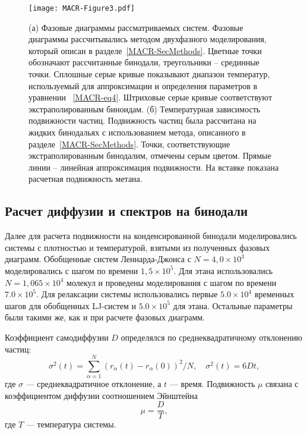 \begin{figure}[!t]
  \centering
  \texttt{[image: MACR-Figure3.pdf]}
  \caption{(а) Фазовые диаграммы рассматриваемых систем. 
    Фазовые диаграммы рассчитывались методом двухфазного моделирования, который описан в разделе~\ref{MACR-SecMethods}.
    Цветные точки обозначают рассчитанные бинодали, треугольники -- срединные точки.
    Сплошные серые кривые показывают диапазон температур, используемый для аппроксимации и определения параметров в уравнении ~\eqref{MACR-eq4}.
    Штриховые серые кривые соответствуют экстраполированным биноидам.
    (б) Температурная зависимость подвижности частиц.
    Подвижность частиц была рассчитана на жидких бинодальях с использованием метода, описанного в разделе~\ref{MACR-SecMethods}.
    Точки, соответствующие экстраполированным бинодалим, отмечены серым цветом. 
    Прямые линии -- линейная аппроксимация подвижности.
    На вставке показана расчетная подвижность метана.}
  \label{MACR-Figure3}
\end{figure}

\subsection{Расчет диффузии и спектров на бинодали}

Далее для расчета подвижности на конденсированной бинодали моделировались системы с плотностью и температурой, взятыми из полученных фазовых диаграмм.
Обобщенные систем Леннарда-Джонса с $N = 4,0 \times 10 ^ 3$ моделировались с шагом по времени $1,5 \times 10 ^ 5$.
Для этана использовались $N = 1,065 \times 10 ^ 4 $ молекул и проведены моделирования с шагом по времени $7.0 \times 10^5 $.
Для релаксации системы использовались первые $ 5.0 \times 10 ^ 4 $ временных шагов для обобщенных LJ-систем и $ 5.0 \times 10 ^ 5 $ для этана.
Остальные параметры были такими же, как и при расчете фазовых диаграмм.

Коэффициент самодиффузии $D$ определялся по среднеквадратичному отклонению частиц:
\begin{equation}
  \sigma^2(t) = \sum\limits_{\alpha = 1}^{N} (r_{\alpha}(t) - r_{\alpha}(0))^2 / N, \quad \sigma^2(t) = 6Dt,
  \label{MACR-eq5}
\end{equation}
где $\sigma$ — среднеквадратичное отклонение, а $t$ — время.
Подвижность $\mu$ связана с коэффициентом диффузии соотношением Эйнштейна
\begin{equation}
  \mu = \frac{D}{T},
  \label{MACR-eq6}
\end{equation}
где $T$ — температура системы.

